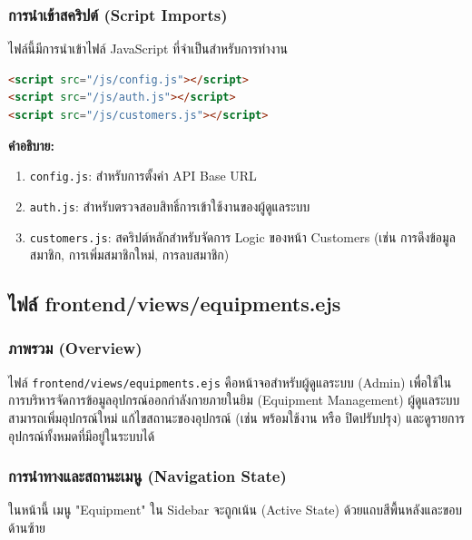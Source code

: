 \subsubsection{การนำเข้าสคริปต์ (Script Imports)}
ไฟล์นี้มีการนำเข้าไฟล์ JavaScript ที่จำเป็นสำหรับการทำงาน

\begin{lstlisting}[language=HTML, caption={ซอร์สโค้ดจากไฟล์ frontend/views/customers.ejs: Scripts}, label={code:views-customers-scripts}]
<script src="/js/config.js"></script>
<script src="/js/auth.js"></script>
<script src="/js/customers.js"></script>
\end{lstlisting}

\textbf{คำอธิบาย:}
\begin{enumerate}
    \item \texttt{config.js}: สำหรับการตั้งค่า API Base URL
    \item \texttt{auth.js}: สำหรับตรวจสอบสิทธิ์การเข้าใช้งานของผู้ดูแลระบบ
    \item \texttt{customers.js}: สคริปต์หลักสำหรับจัดการ Logic ของหน้า Customers (เช่น การดึงข้อมูลสมาชิก, การเพิ่มสมาชิกใหม่, การลบสมาชิก)
\end{enumerate}


\subsection{ไฟล์ frontend/views/equipments.ejs}

\subsubsection{ภาพรวม (Overview)}
ไฟล์ \texttt{frontend/views/equipments.ejs} คือหน้าจอสำหรับผู้ดูแลระบบ (Admin) เพื่อใช้ในการบริหารจัดการข้อมูลอุปกรณ์ออกกำลังกายภายในยิม (Equipment Management) ผู้ดูแลระบบสามารถเพิ่มอุปกรณ์ใหม่ แก้ไขสถานะของอุปกรณ์ (เช่น พร้อมใช้งาน หรือ ปิดปรับปรุง) และดูรายการอุปกรณ์ทั้งหมดที่มีอยู่ในระบบได้

\subsubsection{การนำทางและสถานะเมนู (Navigation State)}
ในหน้านี้ เมนู "Equipment" ใน Sidebar จะถูกเน้น (Active State) ด้วยแถบสีพื้นหลังและขอบด้านซ้าย

